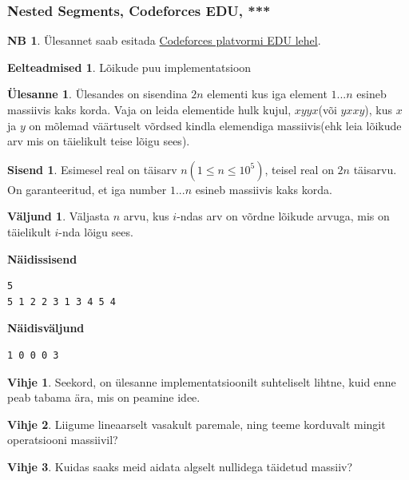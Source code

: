 \documentclass{trkut}
\theoremstyle{definition}
\newtheorem*{prereq}{Eelteadmised}
\newtheorem*{extra}{NB}
\newtheorem*{vihje}{Vihje}
\newtheorem*{Input}{Sisend}
\newtheorem*{Output}{Väljund}
\newtheorem*{Text}{Ülesanne}
\begin{document}
\subsubsection{Nested Segments, Codeforces EDU, ***}
\begin{extra}
Ülesannet saab esitada \href{https://codeforces.com/edu/course/2/lesson/4/3/practice/contest/274545/problem/C}{Codeforces platvormi EDU lehel}.
\end{extra}
\begin{prereq}
Lõikude puu implementatsioon
\end{prereq}
\begin{Text}
Ülesandes on sisendina $2n$ elementi kus iga element $1...n$ esineb massiivis kaks korda. 
Vaja on leida elementide hulk kujul, $xyyx$(või $yxxy$), kus $x$ ja $y$ on mõlemad väärtuselt võrdsed kindla elemendiga massiivis(ehk leia lõikude arv mis on täielikult teise lõigu sees).

\parencite{neseg}
\end{Text}
\begin{Input}
Esimesel real on täisarv $n$$(1\le n\le 10^5)$, teisel real on $2n$ täisarvu. On garanteeritud, et iga number $1...n$  esineb massiivis kaks korda.
\end{Input}
\begin{Output}
Väljasta $n$ arvu, kus $i$-ndas arv on võrdne lõikude arvuga, mis on täielikult $i$-nda lõigu sees.
\end{Output}

\textbf{Näidissisend}

\begin{verbatim}
5
5 1 2 2 3 1 3 4 5 4
\end{verbatim}

\textbf{Näidisväljund}

\begin{verbatim}
1 0 0 0 3 
\end{verbatim}


\begin{vihje}
Seekord, on ülesanne implementatsioonilt suhteliselt lihtne, kuid enne peab tabama ära, mis on peamine idee.
\end{vihje}

\begin{vihje}
Liigume lineaarselt vasakult paremale, ning teeme korduvalt mingit operatsiooni massiivil?
\end{vihje}

\begin{vihje}
Kuidas saaks meid aidata algselt nullidega täidetud massiiv?
\end{vihje}
\end{document}
